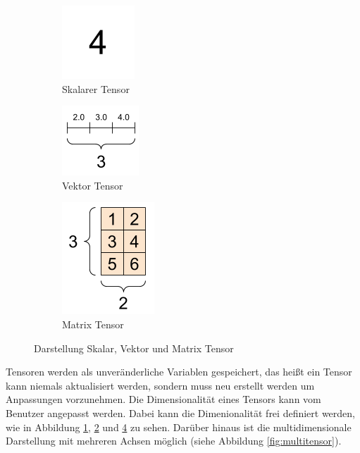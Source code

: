 \begin{figure}[htb]
	\begin{subfigure}[ht]{0.33\textwidth}
		\includegraphics{images/scalar}
		\caption{Skalarer Tensor \cite{tf_tensor}}
		\label{fig:scalartensor}
	\end{subfigure}\hfill%
	\begin{subfigure}[ht]{0.33\textwidth}
		\includegraphics{images/vector}
		\caption{Vektor Tensor \cite{tf_tensor}}
		\label{fig:vectortensor}
	\end{subfigure}\hfill%
	\begin{subfigure}[ht]{0.33\textwidth}
		\includegraphics{images/matrix}
		\caption{Matrix Tensor \cite{tf_tensor}}
		\label{fig:matrixtensor}
	\end{subfigure}\hfill%
	\caption{Darstellung Skalar, Vektor und Matrix Tensor}
\end{figure}

Tensoren werden als unveränderliche Variablen gespeichert, das heißt ein Tensor kann niemals aktualisiert werden, sondern muss neu erstellt werden um Anpassungen vorzunehmen. Die Dimensionalität eines Tensors kann vom Benutzer angepasst werden. Dabei kann die Dimenionalität frei definiert werden, wie in Abbildung \ref{fig:scalartensor}, \ref{fig:vectortensor} und \ref{fig:matrixtensor} zu sehen. Darüber hinaus ist die multidimensionale Darstellung mit mehreren Achsen möglich (siehe Abbildung \ref{fig:multitensor}).

